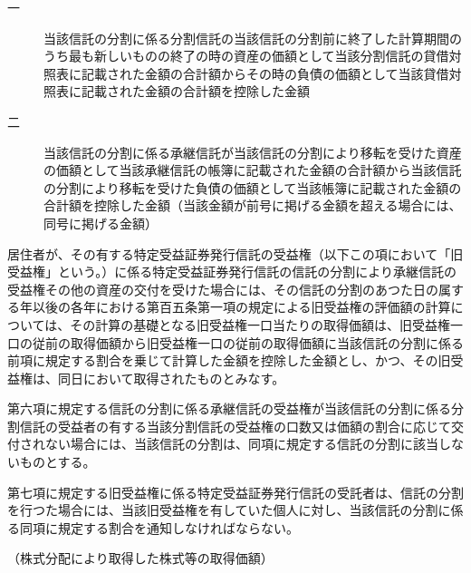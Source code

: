 \documentclass[twocolumn,a4j,10pt]{ltjtarticle}
\begin{document}
\begin{description}
\begin{description}
\item[一]当該信託の分割に係る分割信託の当該信託の分割前に終了した計算期間のうち最も新しいものの終了の時の資産の価額として当該分割信託の貸借対照表に記載された金額の合計額からその時の負債の価額として当該貸借対照表に記載された金額の合計額を控除した金額
\item[二]当該信託の分割に係る承継信託が当該信託の分割により移転を受けた資産の価額として当該承継信託の帳簿に記載された金額の合計額から当該信託の分割により移転を受けた負債の価額として当該帳簿に記載された金額の合計額を控除した金額（当該金額が前号に掲げる金額を超える場合には、同号に掲げる金額）
\end{description}
\item[\rensuji{7}]居住者が、その有する特定受益証券発行信託の受益権（以下この項において「旧受益権」という。）に係る特定受益証券発行信託の信託の分割により承継信託の受益権その他の資産の交付を受けた場合には、その信託の分割のあつた日の属する年以後の各年における第百五条第一項の規定による旧受益権の評価額の計算については、その計算の基礎となる旧受益権一口当たりの取得価額は、旧受益権一口の従前の取得価額から旧受益権一口の従前の取得価額に当該信託の分割に係る前項に規定する割合を乗じて計算した金額を控除した金額とし、かつ、その旧受益権は、同日において取得されたものとみなす。
\item[\rensuji{8}]第六項に規定する信託の分割に係る承継信託の受益権が当該信託の分割に係る分割信託の受益者の有する当該分割信託の受益権の口数又は価額の割合に応じて交付されない場合には、当該信託の分割は、同項に規定する信託の分割に該当しないものとする。
\item[\rensuji{9}]第七項に規定する旧受益権に係る特定受益証券発行信託の受託者は、信託の分割を行つた場合には、当該旧受益権を有していた個人に対し、当該信託の分割に係る同項に規定する割合を通知しなければならない。
\end{description}
\noindent\hspace{10pt}（株式分配により取得した株式等の取得価額）
\end{document}
